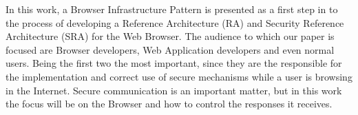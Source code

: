 \documentclass{sig-alternate-05-2015}
\begin{document}
In this work, a Browser Infrastructure Pattern is presented as a first step in to the process of developing a Reference Architecture (RA) and Security Reference Architecture (SRA) for the Web Browser. The audience to which our paper is focused are Browser developers, Web Application developers and even normal users. Being the first two the most important, since they are the responsible for the implementation and correct use of secure mechanisms while a user is browsing in the Internet. Secure communication is an important matter, but in this work the focus will be on the Browser and how to control the responses it receives. %



\end{document}
